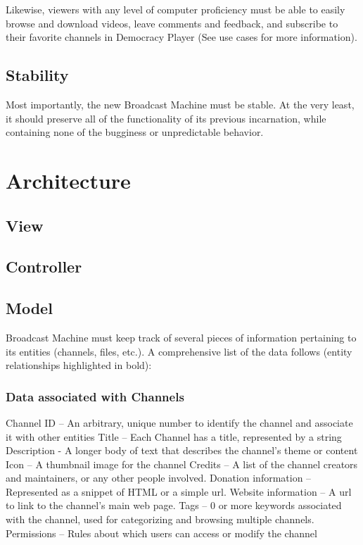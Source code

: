 \documentclass[a4paper,12pt]{report}
\begin{document}
Likewise, viewers with any level of computer proficiency must be able to easily browse and download videos, leave comments and feedback, and subscribe to their favorite channels in Democracy Player (See use cases for more information).

\section{Stability}

	Most importantly, the new Broadcast Machine must be stable. 
At the very least, it should preserve all of the functionality of its previous incarnation, while containing none of the bugginess or unpredictable behavior. 

\chapter{Architecture}

\section{View}

\section{Controller}

\section{Model}
Broadcast Machine must keep track of  several pieces of information pertaining to its entities (channels, files, etc.). 
A comprehensive list of the data follows (entity relationships highlighted in bold):

\subsection{Data associated with Channels}
Channel ID – An arbitrary, unique number to identify the channel and  associate it with other entities
Title – Each Channel has a title, represented by a string
Description - A longer body of text that describes the channel's theme or content
Icon – A thumbnail image for the channel
Credits – A list of the channel creators and maintainers, or any other people involved. 
Donation information – Represented as a snippet of HTML or a simple url.
Website information – A url to link to the channel's main web page.
Tags – 0 or more keywords associated with the channel, used for categorizing and browsing multiple channels.
Permissions – Rules about which users can access or modify the channel
\end{document}
